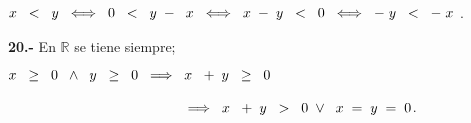 \documentclass[12pt]{article}
\begin{document}
$x\hspace{0.2cm}<\hspace{0.2cm}y\hspace{0.2cm} \Longleftrightarrow \hspace{0.2cm} 0 \hspace{0.2cm}<\hspace{0.2cm} y \hspace{0.1cm} -\hspace{0.2cm} x\hspace{0.2cm} \Longleftrightarrow \hspace{0.2cm} x\hspace{0.1cm}-\hspace{0.1cm}y\hspace{0.2cm}<\hspace{0.2cm}0\hspace{0.2cm}\Longleftrightarrow\hspace{0.2cm}-\hspace{0.1cm}y\hspace{0.2cm}<\hspace{0.2cm}-\hspace{0.1cm}x$ \vspace{0.2cm}.

\textbf{20.-} En $\mathbb{R}$ se tiene siempre;
\vspace{0.1cm}

$x\hspace{0.2cm}\geq\hspace{0.2cm} 0 \hspace{0.2cm}\wedge\hspace{0.2cm} y \hspace{0.2cm}\geq\hspace{0.2cm}0\hspace{0.2cm} \Longrightarrow \hspace{0.2cm} x\hspace{0.21cm}+\hspace{0.1cm}y\hspace{0.2cm}\geq\hspace{0.2cm}0$\vspace{0.1cm}

$\hspace{4.5cm} \Longrightarrow \hspace{0.2cm} x\hspace{0.21cm}+\hspace{0.1cm}y\hspace{0.2cm}>\hspace{0.2cm}0\hspace{0.1cm}\vee \hspace{0.2cm}x\hspace{0.1cm}=\hspace{0.1cm} y\hspace{0.1cm}=\hspace{0.1cm}0$\vspace{0.2cm}.
\end{document}
